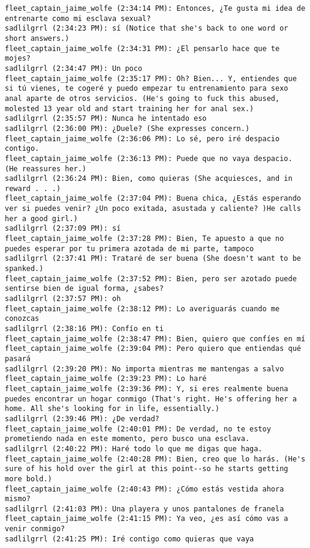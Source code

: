 \begin{verbatim}
fleet_captain_jaime_wolfe (2:34:14 PM): Entonces, ¿Te gusta mi idea de entrenarte como mi esclava sexual?
sadlilgrrl (2:34:23 PM): sí (Notice that she's back to one word or short answers.)
fleet_captain_jaime_wolfe (2:34:31 PM): ¿El pensarlo hace que te mojes?
sadlilgrrl (2:34:47 PM): Un poco
fleet_captain_jaime_wolfe (2:35:17 PM): Oh? Bien... Y, entiendes que si tú vienes, te cogeré y puedo empezar tu entrenamiento para sexo anal aparte de otros servicios. (He's going to fuck this abused, molested 13 year old and start training her for anal sex.)
sadlilgrrl (2:35:57 PM): Nunca he intentado eso
sadlilgrrl (2:36:00 PM): ¿Duele? (She expresses concern.)
fleet_captain_jaime_wolfe (2:36:06 PM): Lo sé, pero iré despacio contigo.
fleet_captain_jaime_wolfe (2:36:13 PM): Puede que no vaya despacio. (He reassures her.)
sadlilgrrl (2:36:24 PM): Bien, como quieras (She acquiesces, and in reward . . .)
fleet_captain_jaime_wolfe (2:37:04 PM): Buena chica, ¿Estás esperando ver si puedes venir? ¿Un poco exitada, asustada y caliente? )He calls her a good girl.)
sadlilgrrl (2:37:09 PM): sí
fleet_captain_jaime_wolfe (2:37:28 PM): Bien, Te apuesto a que no puedes esperar por tu primera azotada de mi parte, tampoco
sadlilgrrl (2:37:41 PM): Trataré de ser buena (She doesn't want to be spanked.)
fleet_captain_jaime_wolfe (2:37:52 PM): Bien, pero ser azotado puede sentirse bien de igual forma, ¿sabes?
sadlilgrrl (2:37:57 PM): oh
fleet_captain_jaime_wolfe (2:38:12 PM): Lo averiguarás cuando me conozcas
sadlilgrrl (2:38:16 PM): Confío en ti
fleet_captain_jaime_wolfe (2:38:47 PM): Bien, quiero que confíes en mí
fleet_captain_jaime_wolfe (2:39:04 PM): Pero quiero que entiendas qué pasará
sadlilgrrl (2:39:20 PM): No importa mientras me mantengas a salvo
fleet_captain_jaime_wolfe (2:39:23 PM): Lo haré
fleet_captain_jaime_wolfe (2:39:36 PM): Y, si eres realmente buena puedes encontrar un hogar conmigo (That's right. He's offering her a home. All she's looking for in life, essentially.)
sadlilgrrl (2:39:46 PM): ¿De verdad?
fleet_captain_jaime_wolfe (2:40:01 PM): De verdad, no te estoy prometiendo nada en este momento, pero busco una esclava.
sadlilgrrl (2:40:22 PM): Haré todo lo que me digas que haga.
fleet_captain_jaime_wolfe (2:40:28 PM): Bien, creo que lo harás. (He's sure of his hold over the girl at this point--so he starts getting more bold.)
fleet_captain_jaime_wolfe (2:40:43 PM): ¿Cómo estás vestida ahora mismo?
sadlilgrrl (2:41:03 PM): Una playera y unos pantalones de franela
fleet_captain_jaime_wolfe (2:41:15 PM): Ya veo, ¿es así cómo vas a venir conmigo?
sadlilgrrl (2:41:25 PM): Iré contigo como quieras que vaya

\end{verbatim}
